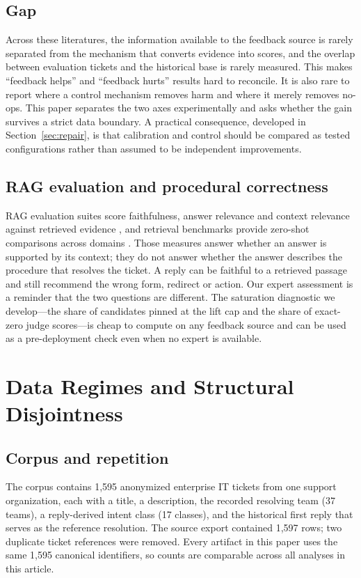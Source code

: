 \documentclass{ieeeaccess}
\begin{document}
\subsection{Gap}
Across these literatures, the information available to the feedback source is
rarely separated from the mechanism that converts evidence into scores, and the
overlap between evaluation tickets and the historical base is rarely measured.
This makes ``feedback helps'' and ``feedback hurts'' results hard to reconcile.
It is also rare to report where a control mechanism removes harm and where it
merely removes no-ops. This paper separates the two axes experimentally and asks
whether the gain survives a strict data boundary. A practical consequence,
developed in Section~\ref{sec:repair}, is that calibration and control should be
compared as tested configurations rather than assumed to be independent
improvements.

\subsection{RAG evaluation and procedural correctness}
RAG evaluation suites score faithfulness, answer relevance and context relevance
against retrieved evidence \cite{b40,b41,b42}, and retrieval benchmarks provide
zero-shot comparisons across domains \cite{b43}. Those measures answer whether an
answer is supported by its context; they do not answer whether the answer describes
the procedure that resolves the ticket. A reply can be faithful to a retrieved
passage and still recommend the wrong form, redirect or action. Our expert
assessment is a reminder that the two questions are different. The saturation
diagnostic we develop---the share of candidates pinned at the lift cap and the
share of exact-zero judge scores---is cheap to compute on any feedback source and
can be used as a pre-deployment check even when no expert is available.


\section{Data Regimes and Structural Disjointness}
\label{sec:data}

\subsection{Corpus and repetition}
The corpus contains 1,595 anonymized enterprise IT tickets from one support
organization, each with a title, a description, the recorded resolving team
(37 teams), a reply-derived intent class (17 classes), and the historical first
reply that serves as the reference resolution. The source export contained 1,597
rows; two duplicate ticket references were removed. Every artifact in this paper
uses the same 1,595 canonical identifiers, so counts are comparable across all
analyses in this article.
\end{document}
